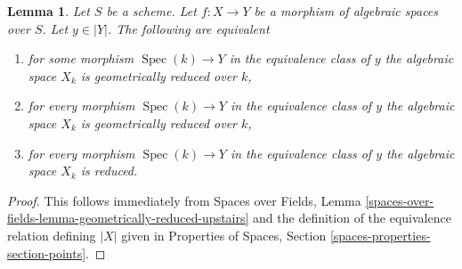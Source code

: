 \documentclass[10pt,a4paper]{amsart}
\theoremstyle{plain}
\newtheorem{lemma}[subsection]{Lemma}
\theoremstyle{definition}
\theoremstyle{remark}
\numberwithin{equation}{subsection}
\def\Spec{\mathop{\mathrm{Spec}}}
\begin{document}
\begin{lemma}
\label{lemma-geometrically-reduced-fibre}
Let $S$ be a scheme. Let $f : X \to Y$ be a
morphism of algebraic spaces over $S$. Let $y \in |Y|$.
The following are equivalent
\begin{enumerate}
\item for some morphism $\Spec(k) \to Y$ in the equivalence class
of $y$ the algebraic space $X_k$ is geometrically reduced over $k$,
\item for every morphism $\Spec(k) \to Y$ in the equivalence class
of $y$ the algebraic space $X_k$ is geometrically reduced over $k$,
\item for every morphism $\Spec(k) \to Y$ in the equivalence class
of $y$ the algebraic space $X_k$ is reduced.
\end{enumerate}
\end{lemma}

\begin{proof}
This follows immediately from Spaces over Fields, Lemma
\ref{spaces-over-fields-lemma-geometrically-reduced-upstairs}
and the definition of the equivalence relation defining $|X|$
given in
Properties of Spaces, Section \ref{spaces-properties-section-points}.
\end{proof}
\end{document}
